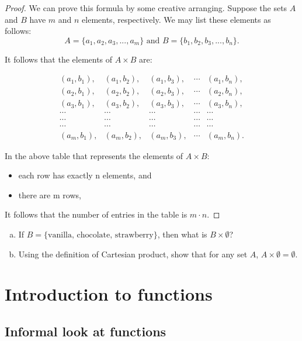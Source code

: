 \begin{proof}
We can prove this formula  by some creative arranging.  Suppose the sets $A$ and $B$ have $m$ and $n$ elements, respectively. We may list these elements as follows: 
\[ A = \{a_1,a_2,a_3,...,a_m\} \mbox{ and } B = \{b_1,b_2,b_3,...,b_n\}. \]
 
It follows that the elements of $A \times B$ are: 

\[ \begin{array}{ccccc}
(a_1, b_1), & (a_1, b_2), & (a_1, b_3), & \cdots & (a_1, b_n), \\
(a_2, b_1), & (a_2, b_2), & (a_2, b_3), & \cdots & (a_2, b_n), \\
(a_3, b_1), & (a_3, b_2), & (a_3, b_3), & \cdots & (a_3, b_n), \\
\cdots & \cdots & \cdots & \cdots & \cdots \\ 
\cdots & \cdots & \cdots & \cdots & \cdots \\ 
\cdots & \cdots & \cdots & \cdots & \cdots \\ 
(a_m, b_1), & (a_m, b_2), & (a_m, b_3), & \cdots & (a_m, b_n). 
\end{array}  \]

In the above table that represents the elements of $A \times B$:
\begin{itemize}
\item 
each row has exactly n elements, and 
\item
there are m rows, 
\end{itemize}

It follows that the number of entries in the table is $m \cdot n$.
\end{proof}

\begin{exercise}{}
\begin{enumerate}[(a)]
\item
If $B = \{\mbox{vanilla, chocolate, strawberry} \}$, then what is $B \times \emptyset$?
\item
Using the definition of Cartesian product, show that for any set $A$, $A \times \emptyset = \emptyset$.
\end{enumerate}
\end{exercise}



\section{Introduction to functions}


\subsection{Informal look at functions}

